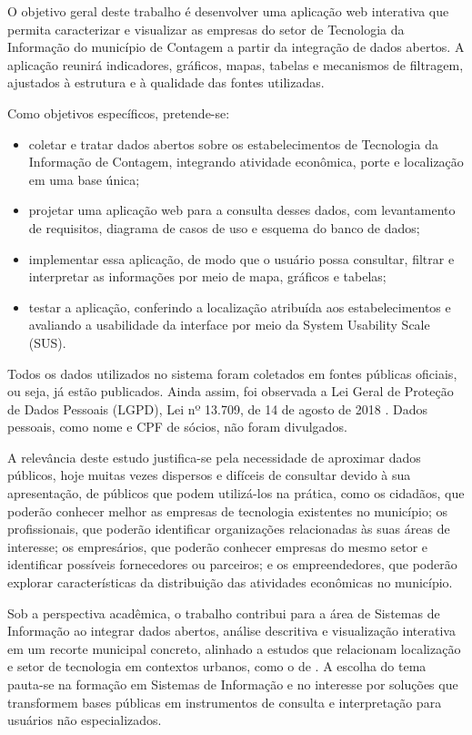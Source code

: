 \documentclass[a4paper,12pt]{article}
\begin{document}
O objetivo geral deste trabalho é desenvolver uma aplicação web interativa que permita caracterizar e visualizar as empresas do setor de Tecnologia da Informação do município de Contagem a partir da integração de dados abertos.
A aplicação reunirá indicadores, gráficos, mapas, tabelas e mecanismos de filtragem, ajustados à estrutura e à qualidade das fontes utilizadas.

Como objetivos específicos, pretende-se:

\begin{itemize}
    \item coletar e tratar dados abertos sobre os estabelecimentos de Tecnologia da Informação de Contagem, integrando atividade econômica, porte e localização em uma base única;
    \item projetar uma aplicação web para a consulta desses dados, com levantamento de requisitos, diagrama de casos de uso e esquema do banco de dados;
    \item implementar essa aplicação, de modo que o usuário possa consultar, filtrar e interpretar as informações por meio de mapa, gráficos e tabelas;
    \item testar a aplicação, conferindo a localização atribuída aos estabelecimentos e avaliando a usabilidade da interface por meio da System Usability Scale (SUS).
\end{itemize}

Todos os dados utilizados no sistema foram coletados em fontes públicas oficiais, ou seja, já estão publicados.
Ainda assim, foi observada a Lei Geral de Proteção de Dados Pessoais (LGPD), Lei nº 13.709, de 14 de agosto de 2018 \cite{brasil2018}.
Dados pessoais, como nome e CPF de sócios, não foram divulgados.

A relevância deste estudo justifica-se pela necessidade de aproximar dados públicos, hoje muitas vezes dispersos e difíceis de consultar devido à sua apresentação, de públicos que podem utilizá-los na prática, como os cidadãos, que poderão conhecer melhor as empresas de tecnologia existentes no município; os profissionais, que poderão identificar organizações relacionadas às suas áreas de interesse; os empresários, que poderão conhecer empresas do mesmo setor e identificar possíveis fornecedores ou parceiros; e os empreendedores, que poderão explorar características da distribuição das atividades econômicas no município.

Sob a perspectiva acadêmica, o trabalho contribui para a área de Sistemas de Informação ao integrar dados abertos, análise descritiva e visualização interativa em um recorte municipal concreto, alinhado a estudos que relacionam localização e setor de tecnologia em contextos urbanos, como o de .
A escolha do tema pauta-se na formação em Sistemas de Informação e no interesse por soluções que transformem bases públicas em instrumentos de consulta e interpretação para usuários não especializados.
\end{document}
